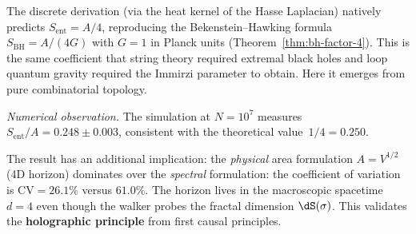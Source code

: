 \begin{result}[title={The Bekenstein--Hawking $1/4$ coefficient}]
\label{res:bh-factor-4}
The discrete derivation (via the heat kernel of the Hasse Laplacian)
natively predicts $S_{\mathrm{ent}} = A/4$, reproducing the
Bekenstein--Hawking formula $S_{\mathrm{BH}} = A/(4G)$ with $G = 1$
in Planck units (Theorem~\ref{thm:bh-factor-4}). This is the same
coefficient that string theory required extremal black holes and loop
quantum gravity required the Immirzi parameter to obtain. Here it
emerges from pure combinatorial topology.
\end{result}

\noindent\textit{Numerical observation.}\enspace
The simulation at $N = 10^7$ measures $S_{\mathrm{ent}}/A = 0{.}248
\pm 0{.}003$, consistent with the theoretical value~$1/4 = 0{.}250$.

The result has an additional implication: the \emph{physical} area
formulation $A = V^{1/2}$ (4D horizon) dominates over the
\emph{spectral} formulation: the coefficient of variation is
$\mathrm{CV} = 26{.}1\%$ versus $61{.}0\%$. The horizon lives in the
macroscopic spacetime $d = 4$ even though the walker probes the
fractal dimension $\dS(\sigma)$. This validates the
\textbf{holographic principle} from first causal principles.

